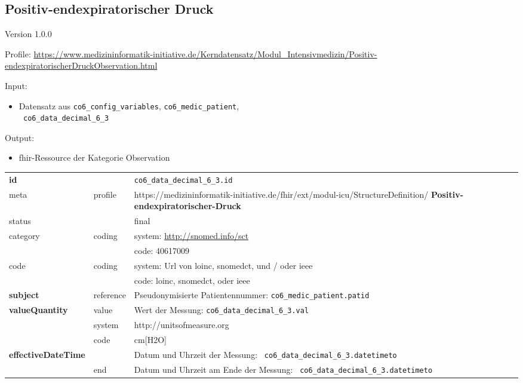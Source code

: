 \subsection{Positiv-endexpiratorischer Druck} 
\noindent Version 1.0.0

\noindent Profile: \url{https://www.medizininformatik-initiative.de/Kerndatensatz/Modul_Intensivmedizin/Positiv-endexpiratorischerDruckObservation.html}

\noindent Input:
\begin{itemize}
	\item Datensatz aus \texttt{co6\_config\_variables}, \texttt{co6\_medic\_patient}, \\ \texttt{
co6\_data\_decimal\_6\_3}
\end{itemize}
Output:
\begin{itemize}
        \item \ac{fhir}-Ressource der Kategorie \glqq Observation\grqq{}
\end{itemize}
\begin{longtable}{|l|l|p{7.5cm}|}
        \hline
        \rowcolor{lightgray} \multicolumn{3}{|l|}{Data Mapping (inhaltlich)} \\ \hline
        \textbf{id} &  & \texttt{co6\_data\_decimal\_6\_3.id} \\ \hline
	meta & profile & https://medizininformatik-initiative.de/fhir/ext/modul-icu/StructureDefinition/\textbf{
Positiv-endexpiratorischer-Druck} \\ \hline 
	status &  & final   \\ \hline 
	category & coding & system: \url{http://snomed.info/sct} \\
\cline{3-3}
	& & code: 40617009 \\ \hline
	code & coding & system: Url von \ac{loinc}, \ac{snomedct}, und / oder \ac{ieee} \\ 
	\cline{3-3} 
	 &  & code: \ac{loinc}, \ac{snomedct}, oder \ac{ieee} \\ \hline
	 \textbf{subject}  & reference & Pseudonymisierte Patientennummer: \texttt{co6\_medic\_patient.patid} \\ \hline
	 \textbf{valueQuantity}  & value & Wert der Messung: \texttt{co6\_data\_decimal\_6\_3.val} \\
        \cline{2-3}
         & system & http://unitsofmeasure.org \\
         \cline{2-3}
         & code & cm[H2O] \\ \hline
     \textbf{effectiveDateTime}  & & Datum und Uhrzeit der Messung: \texttt{
co6\_data\_decimal\_6\_3.datetimeto} \\
    \cline{2-3}
     & end & Datum und Uhrzeit am Ende der Messung: \texttt{
co6\_data\_decimal\_6\_3.datetimeto} \\ \hline
\end{longtable}


